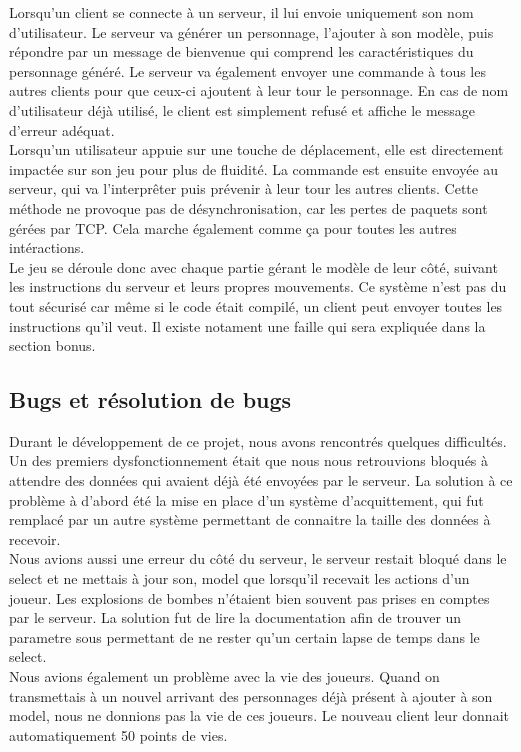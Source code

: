 \documentclass[12pt]{article}
\begin{document}
Lorsqu'un client se connecte à un serveur, il lui envoie uniquement son nom d'utilisateur. Le serveur va générer un personnage, l'ajouter à son modèle, puis répondre par un message de bienvenue qui comprend les caractéristiques du personnage généré. Le serveur va également envoyer une commande à tous les autres clients pour que ceux-ci ajoutent à leur tour le personnage. En cas de nom d'utilisateur déjà utilisé, le client est simplement refusé et affiche le message d'erreur adéquat.
\\

Lorsqu'un utilisateur appuie sur une touche de déplacement, elle est directement impactée sur son jeu pour plus de fluidité. La commande est ensuite envoyée au serveur, qui va l'interprêter puis prévenir à leur tour les autres clients. Cette méthode ne provoque pas de désynchronisation, car les pertes de paquets sont gérées par TCP. Cela marche également comme ça pour toutes les autres intéractions.
\\

Le jeu se déroule donc avec chaque partie gérant le modèle de leur côté, suivant les instructions du serveur et leurs propres mouvements. Ce système n'est pas du tout sécurisé car même si le code était compilé, un client peut envoyer toutes les instructions qu'il veut. Il existe notament une faille qui sera expliquée dans la section bonus.

\subsection{Bugs et résolution de bugs}
Durant le développement de ce projet, nous avons rencontrés quelques difficultés. Un des premiers dysfonctionnement était que nous nous retrouvions bloqués à attendre des données qui avaient déjà été envoyées par le serveur. La solution à ce problème à d'abord été la mise en place d'un système d'acquittement, qui fut remplacé par un autre système permettant de connaitre la taille des données à recevoir.
\\
Nous avions aussi une erreur du côté du serveur, le serveur restait bloqué dans le select et ne mettais à jour son, model que lorsqu'il recevait les actions d'un joueur. Les explosions de bombes n'étaient bien souvent pas prises en comptes par le serveur. La solution fut de lire la documentation afin de trouver un parametre sous permettant de ne rester qu'un certain lapse de temps dans le select.\\

Nous avions également un problème avec la vie des joueurs. Quand on transmettais à un nouvel arrivant des personnages déjà présent à ajouter à son model, nous ne donnions pas la vie de ces joueurs. Le nouveau client leur donnait automatiquement 50 points de vies.\\
\end{document}
